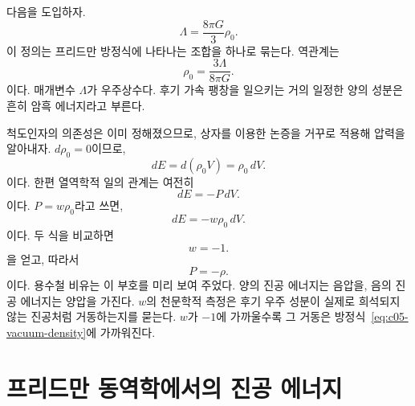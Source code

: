 다음을 도입하자.
\begin{equation}
\Lambda=\frac{8\pi G}{3}\rho_0.
\label{eq:c05-lambda-definition}
\end{equation}
이 정의는 프리드만 방정식에 나타나는 조합을 하나로 묶는다. 역관계는
\begin{equation}
\rho_0=\frac{3\Lambda}{8\pi G}.
\end{equation}
이다. 매개변수 \(\Lambda\)가 우주상수다. 후기 가속 팽창을 일으키는 거의 일정한 양의 성분은 흔히 암흑 에너지라고 부른다.

척도인자의 의존성은 이미 정해졌으므로, 상자를 이용한 논증을 거꾸로 적용해 압력을 알아내자. \(d\rho_0=0\)이므로,
\begin{equation}
dE=d(\rho_0V)=\rho_0\,dV.
\end{equation}
이다. 한편 열역학적 일의 관계는 여전히
\begin{equation}
dE=-P\,dV.
\end{equation}
이다. \(P=w\rho_0\)라고 쓰면,
\begin{equation}
dE=-w\rho_0\,dV.
\end{equation}
이다. 두 식을 비교하면
\begin{equation}
w=-1.
\end{equation}
을 얻고, 따라서
\begin{equation}
P=-\rho.
\end{equation}
이다. 용수철 비유는 이 부호를 미리 보여 주었다. 양의 진공 에너지는 음압을, 음의 진공 에너지는 양압을 가진다. \(w\)의 천문학적 측정은 후기 우주 성분이 실제로 희석되지 않는 진공처럼 거동하는지를 묻는다. \(w\)가 \(-1\)에 가까울수록 그 거동은 방정식~\eqref{eq:c05-vacuum-density}에 가까워진다.

\begin{classroomqa}
\end{classroomqa}

\section{프리드만 동역학에서의 진공 에너지}

